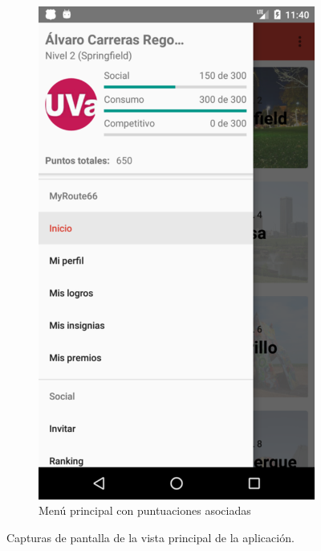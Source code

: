 \documentclass[twoside]{report}
\begin{document}
\begin{figure}[H]
\begin{center}
\begin{subfigure}[t]{.3\linewidth}
		\includegraphics[scale=0.2]{images/userguide/3.png}
		\caption{Menú principal con puntuaciones asociadas}
	\end{subfigure}
\caption{Capturas de pantalla de la vista principal de la aplicación.}
\end{center}
\end{figure}
\end{document}
